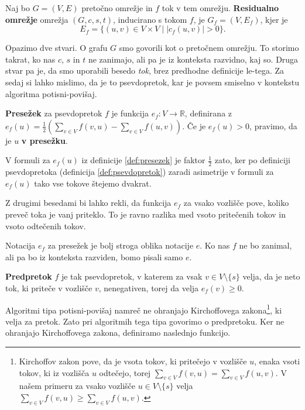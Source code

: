 \documentclass[mat1]{fmfdelo}
\begin{document}
\begin{definicija}
  Naj bo $G = (V,E)$ pretočno omrežje in $f$ tok v tem omrežju. \textbf{Residualno omrežje} omrežja $(G,c,s,t)$, inducirano s tokom $f$, je $G_f = (V,E_f)$, kjer je \[ E_f = \{ (u,v) \in V \times V \mid |c_f(u,v)| > 0 \}. \]
\end{definicija}

\begin{opomba}
  Opazimo dve stvari. O grafu $G$ smo govorili kot o pretočnem omrežju. To storimo takrat, ko nas $c$, $s$ in $t$ ne zanimajo, ali pa je iz konteksta razvidno, kaj so. Druga stvar pa je, da smo uporabili besedo \textit{tok}, brez predhodne definicije le-tega.
  Za sedaj si lahko mislimo, da je to psevdopretok, kar je povsem smiselno v kontekstu algoritma potisni-povišaj.
\end{opomba}

\begin{definicija}\label{def:presezek}
\textbf{Presežek} za psevdopretok $f$ je funkcija $e_f \colon V \rightarrow \mathbb{R}$, definirana z $e_f(u) = \frac{1}{2}\left(\sum_{v \in V} f(v,u) - \sum_{v \in V} f(u,v)\right)$. Če je $e_f(u) > 0$, pravimo, da je $u$ \textbf{v presežku}.
\end{definicija}

\begin{opomba}
  V formuli za $e_f(u)$ iz definicije \ref{def:presezek} je faktor $\frac{1}{2}$ zato, ker po definiciji psevdopretoka (definicija \ref{def:psevdopretok}) zaradi asimetrije v formuli za $e_f(u)$ tako vse tokove štejemo dvakrat.
\end{opomba}

Z drugimi besedami bi lahko rekli, da funkcija $e_f$ za vsako vozlišče pove, koliko preveč toka je vanj priteklo. To je ravno razlika med vsoto pritečenih tokov in vsoto odtečenih tokov.

\begin{opomba}
  Notacija $e_f$ za presežek je bolj stroga oblika notacije $e$. Ko nas $f$ ne bo zanimal, ali pa bo iz konteksta razviden, bomo pisali samo $e$.
\end{opomba}

\begin{definicija}
\textbf{Predpretok} $f$ je tak psevdopretok, v katerem za vsak $v \in V \setminus\{s\}$ velja, da je neto tok, ki priteče v vozlišče $v$, nenegativen, torej da velja $e_f(v) \geq 0$.
\end{definicija}

Algoritmi tipa potisni-povišaj namreč ne ohranjajo Kirchoffovega zakona\footnote{Kirchoffov zakon pove, da je vsota tokov, ki pritečejo v vozlišče $u$, enaka vsoti tokov, ki iz vozlišča $u$ odtečejo, torej $\sum_{v\in V} f(v,u) = \sum_{v\in V} f(u,v)$. V našem primeru za vsako vozlišče $u \in V \setminus \{s\}$ velja $\sum_{v\in V} f(v,u) \geq \sum_{v\in V} f(u,v)$.}, ki velja za pretok. Zato pri algoritmih tega tipa govorimo o predpretoku. Ker ne ohranjajo Kirchoffovega zakona, definiramo naslednjo funkcijo.
\end{document}
